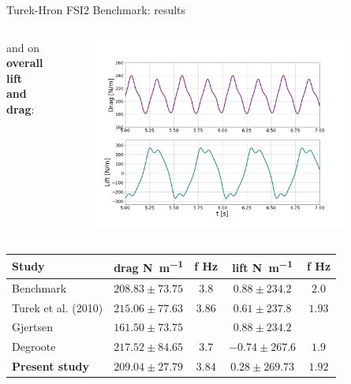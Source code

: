 \documentclass[10pt,t]{beamer}
\begin{document}
\begin{frame}{Turek-Hron FSI2 Benchmark: results}

\begin{columns}

and on\\ \textbf{overall lift and drag}:



\vspace{-1cm}

\begin{figure}[htbp!]
	\centering
	\includegraphics[width=0.9\textwidth, trim=20 40 20 20, clip]{images/FSI2/fsi2_forces_pres.png}
\end{figure}

\end{columns}

\footnotesize
\begin{center}
\begin{tabular}{ l | c c | c c  |  } 
	Study & drag \si{N.m^{-1}} & f \si{Hz} & lift \si{N.m^{-1}} & f \si{Hz}    \\ 
	\hline
	\hline
	Benchmark & $208.83\pm73.75$ & $3.8$ & $0.88\pm234.2$ & $2.0$     \\
	Turek et al. (2010) & $215.06\pm77.63$ & $3.86$ & $0.61\pm237.8$ & $1.93$\\   
	Gjertsen & $161.50\pm73.75$ & & $0.88\pm234.2$ & \\
	Degroote  & $217.52\pm84.65$ & $3.7$ & $-0.74\pm267.6$ & $1.9$ \\
	\hline
	\cellcolor{green!10}\textbf{Present study} & \cellcolor{green!10}$209.04\pm27.79$ &
	\cellcolor{green!10}$3.84$ & \cellcolor{green!10}$0.28\pm269.73$ & \cellcolor{green!10}$1.92$ \\
\end{tabular}
    
\end{center}

\end{frame}
\end{document}
